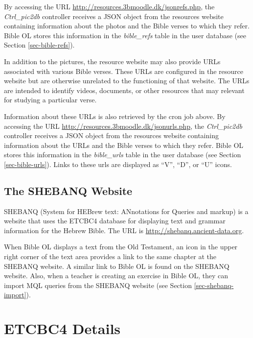 \documentclass[11pt,oneside,a4paper]{memoir}
\begin{document}
By accessing the URL \url{http://resources.3bmoodle.dk/jsonrefs.php}, the \emph{Ctrl\_pic2db}
controller receives a JSON object from the resources website containing information about the photos
and the Bible verses to which they refer. Bible OL stores this information in the
\emph{bible\_refs} table in the user database (see Section
\ref{sec-bible-refs}).

In addition to the pictures, the resource website may also provide URLs associated with various
Bible verses. These URLs are configured in the resource website but are otherwise unrelated to the
functioning of that website. The URLs are intended to identify videos, documents, or other resources
that may relevant for studying a particular verse.

Information about these URLs is also retrieved by the cron job above. By accessing the URL
\url{http://resources.3bmoodle.dk/jsonurls.php}, the \emph{Ctrl\_pic2db} controller receives a JSON
object from the resources website containing information about the URLs and the Bible verses to
which they refer. Bible OL stores this information in the \emph{bible\_urls}%
table in the user database (see Section \ref{sec-bible-urls}). Links to these
urls are displayed as ``V'', ``D'', or ``U'' icons.

\section{The SHEBANQ Website}\label{sec-shebanq}

SHEBANQ (System for HEBrew text: ANnotations for Queries and markup) is a website that uses the
ETCBC4 database for displaying text and grammar information for the Hebrew Bible. The URL is
\url{http://shebanq.ancient-data.org}.

When Bible OL displays a text from the Old Testament, an icon in the upper right corner of the text
area provides a link to the same chapter at the SHEBANQ website. A similar link to Bible OL is found
on the SHEBANQ website. Also, when a teacher is creating an exercise in Bible OL, they can import
MQL queries from the SHEBANQ website (see Section \ref{sec-shebanq-import}).


\appendix
\chapter{ETCBC4 Details}\label{app-etcbc}
\end{document}
